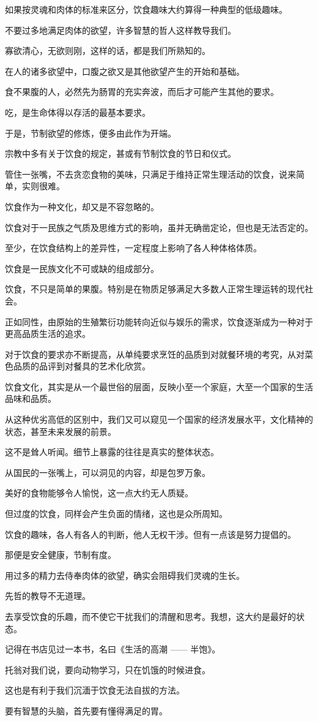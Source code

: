 	\endwriting



		如果按灵魂和肉体的标准来区分，饮食趣味大约算得一种典型的低级趣味。\par
		不要过多地满足肉体的欲望，许多智慧的哲人这样教导我们。\par
		寡欲清心，无欲则刚，这样的话，都是我们所熟知的。\par
		在人的诸多欲望中，口腹之欲又是其他欲望产生的开始和基础。\par
		食不果腹的人，必然先为肠胃的充实奔波，而后才可能产生其他的要求。\par
		吃，是生命体得以存活的最基本要求。\par
		于是，节制欲望的修炼，便多由此作为开端。\par
		宗教中多有关于饮食的规定，甚或有节制饮食的节日和仪式。\par
		管住一张嘴，不去贪恋食物的美味，只满足于维持正常生理活动的饮食，说来简单，实则很难。

		饮食作为一种文化，却又是不容忽略的。\par
		饮食对于一民族之气质及思维方式的影响，虽并无确凿定论，但也是无法否定的。\par
		至少，在饮食结构上的差异性，一定程度上影响了各人种体格体质。\par
		饮食是一民族文化不可或缺的组成部分。\par
		饮食，不只是简单的果腹。特别是在物质足够满足大多数人正常生理运转的现代社会。\par
		正如同性，由原始的生殖繁衍功能转向近似与娱乐的需求，饮食逐渐成为一种对于更高品质生活的追求。\par
		对于饮食的要求亦不断提高，从单纯要求烹饪的品质到对就餐环境的考究，从对菜色品质的品评到对餐具的艺术化欣赏。\par
		饮食文化，其实是从一个最世俗的层面，反映小至一个家庭，大至一个国家的生活品味和品质。\par
		从这种优劣高低的区别中，我们又可以窥见一个国家的经济发展水平，文化精神的状态，甚至未来发展的前景。\par
		这不是耸人听闻。细节上暴露的往往是真实的整体状态。\par
		从国民的一张嘴上，可以洞见的内容，却是包罗万象。

		美好的食物能够令人愉悦，这一点大约无人质疑。\par
		但过度的饮食，同样会产生负面的情绪，这也是众所周知。\par
		饮食的趣味，各人有各人的判断，他人无权干涉。但有一点该是努力提倡的。\par
		那便是安全健康，节制有度。\par
		用过多的精力去侍奉肉体的欲望，确实会阻碍我们灵魂的生长。\par
		先哲的教导不无道理。\par
		去享受饮食的乐趣，而不使它干扰我们的清醒和思考。我想，这大约是最好的状态。\par
		记得在书店见过一本书，名曰《生活的高潮 —— 半饱》。\par
		托翁对我们说，要向动物学习，只在饥饿的时候进食。\par
		这也是有利于我们沉湎于饮食无法自拔的方法。\par
		要有智慧的头脑，首先要有懂得满足的胃。

